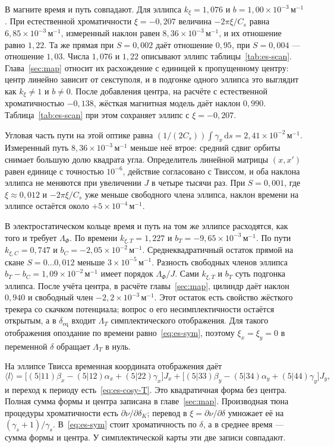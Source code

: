 \documentclass[aps,pra,preprint,a4paper,amsmath,amssymb,longbibliography]{revtex4-2}
\begin{document}
В магните время и путь совпадают. Для эллипса $k_{\xi}=1{,}076$ и $b=1{,}00\times 10^{-3}\,\text{м}^{-1}$. При естественной хроматичности $\xi=-0{,}207$ величина $-2\pi\xi/C_s$ равна $6{,}85\times 10^{-3}\,\text{м}^{-1}$, измеренный наклон равен $8{,}36\times 10^{-3}\,\text{м}^{-1}$, и их отношение равно $1{,}22$. Та же прямая при $S=0{,}002$ даёт отношение $0{,}95$, при $S=0{,}004$ --- отношение $1{,}03$. Числа $1{,}076$ и $1{,}22$ описывают эллипс таблицы~\ref{tab:es-scan}. Глава~\ref{sec:map} относит их расхождение с единицей к пропущенному центру: центр линейно зависит от секступоля, и в подгонке одного эллипса это выглядит как $k_{\xi}\neq 1$ и $b\neq 0$. После добавления центра, на расчёте с естественной хроматичностью $-0{,}138$, жёсткая магнитная модель даёт наклон $0{,}990$. Таблица~\ref{tab:es-scan} при этом сохраняет эллипс с $\xi=-0{,}207$.

Угловая часть пути на этой оптике равна $(1/(2C_s))\int\gamma_x\,\mathrm{d}s=2{,}41\times 10^{-2}\,\text{м}^{-1}$. Измеренный путь $8{,}36\times 10^{-3}\,\text{м}^{-1}$ меньше неё втрое: средний сдвиг орбиты снимает большую долю квадрата угла. Определитель линейной матрицы $(x,x')$ равен единице с точностью $10^{-6}$, действие согласовано с Твиссом, и оба наклона эллипса не меняются при увеличении $J$ в четыре тысячи раз. При $S=0{,}001$, где $\xi\approx 0{,}012$ и $-2\pi\xi/C_s$ уже меньше свободного члена эллипса, наклон времени на эллипсе остаётся около $+5\times 10^{-4}\,\text{м}^{-1}$.

В электростатическом кольце время и путь на том же эллипсе расходятся, как того и требует $\Lambda_\Phi$. По времени $k_{\xi,T}=1{,}227$ и $b_T=-9{,}65\times 10^{-3}\,\text{м}^{-1}$. По пути $k_{\xi,C}=0{,}747$ и $b_C=-2{,}05\times 10^{-2}\,\text{м}^{-1}$. Среднеквадратичный остаток прямой на скане $S=0\ldots 0{,}012$ меньше $3\times 10^{-5}\,\text{м}^{-1}$. Разность свободных членов эллипса $b_T-b_C=1{,}09\times 10^{-2}\,\text{м}^{-1}$ имеет порядок $\Lambda_\Phi/J$. Сами $k_{\xi,T}$ и $b_T$ суть подгонка эллипса. После учёта центра, в расчёте главы~\ref{sec:map}, цилиндр даёт наклон $0{,}940$ и свободный член $-2{,}2\times 10^{-3}\,\text{м}^{-1}$. Этот остаток есть свойство жёсткого трекера со скачком потенциала; вопрос о его несимплектичности остаётся открытым, а в $\delta_{\mathrm{eq}}$ входит $\Lambda_T$ симплектического отображения. Для такого отображения опоздание по времени равно~\eqref{eq:es-sym}, поэтому $\xi_x=\xi_y=0$ в переменной $\delta$ обращает $\Lambda_T$ в нуль.

На эллипсе Твисса временная координата отображения даёт
\begin{equation}
\label{eq:es-map-L}
\langle l\rangle
=\bigl[(5|11)\beta_x-(5|12)\alpha_x+(5|22)\gamma_x\bigr]J_x
+\bigl[(5|33)\beta_y-(5|34)\alpha_y+(5|44)\gamma_y\bigr]J_y,
\end{equation}
и переход к периоду есть~\eqref{eq:es-cosy-T}. Это квадратичная форма без центра. Полная сумма формы и центра записана в главе~\ref{sec:map}. Производная тюна процедуры хроматичности есть $\partial\nu/\partial\delta_K$; перевод в $\xi=\partial\nu/\partial\delta$ умножает её на $(\gamma_s+1)/\gamma_s$. В~\eqref{eq:es-sym} стоит хроматичность по $\delta$, а в среднее время --- сумма формы и центра. У симплектической карты эти две записи совпадают.
\end{document}
